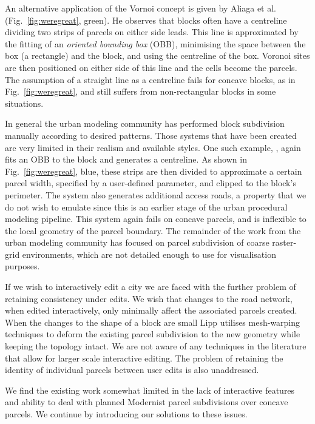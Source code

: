 An alternative application of the Vornoi concept is given by Aliaga et al.\cite{Aliaga08} (Fig.~\ref{fig:weregreat}, green). He observes that blocks often have a centreline dividing two strips of parcels on either side leads. This line is approximated by the fitting of an \emph{oriented bounding box} (OBB), minimising the space between the box (a rectangle) and the block, and using the centreline of the box. Voronoi sites are then positioned on either side of this line and the cells become the parcels. The assumption of a straight line as a centreline fails for concave blocks, as in Fig.~\ref{fig:weregreat}, and still suffers from non-rectangular blocks in some situations.

In general the urban modeling community has performed block subdivision manually according to desired patterns\cite{thadani2010language, parolek2008form}. Those systems that have been created are very limited in their realism and available styles\cite{walker2011planners,halatschEtAl:2008,marshal:CDE:09}. One such example, \cite{Wickramasuriya11}, again fits an OBB to the block and generates a centreline. As shown in Fig.~\ref{fig:weregreat}, blue, these strips are then divided to approximate a certain parcel width, specified by a user-defined parameter, and clipped to the block's perimeter.  The system also generates additional access roads, a property that we do not wish to emulate since this is an earlier stage of the urban procedural modeling pipeline. This system again fails on concave parcels, and is inflexible to the local geometry of the parcel boundary. The remainder of the work from the urban modeling community has focused on parcel subdivision of coarse raster-grid environments\cite{Ko06,Alexandridis07,Morgan09}, which are not detailed enough to use for visualisation purposes.

If we wish to interactively edit a city we are faced with the further problem of retaining consistency under edits. We wish that changes to the road network, when edited interactively, only minimally affect the associated parcels created. When the changes to the shape of a block are small Lipp\cite{Lipp11} utilises mesh-warping techniques to deform the existing parcel subdivision to the new geometry while keeping the topology intact. We are not aware of any techniques in the literature that allow for larger scale interactive editing. The problem of retaining the identity of individual parcels between user edits is also unaddressed.

We find the existing work somewhat limited in the lack of interactive features and ability to deal with planned Modernist parcel subdivisions over concave parcels. We continue by introducing our solutions to these issues.

